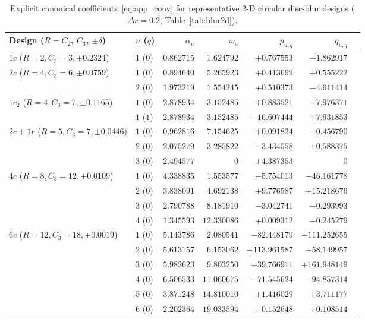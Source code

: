 \documentclass[11pt,a4paper]{article}
\theoremstyle{plain}
\theoremstyle{definition}
\begin{document}
\begin{table}[h]
\centering
\caption{Explicit canonical coefficients~\eqref{eq:app_conv} for representative 2-D circular disc-blur designs ($\Delta r = 0.2$, Table~\ref{tab:blur2d}).}\label{tab:app_blur}
\smallskip
{\scriptsize\setlength{\tabcolsep}{3.8pt}
\begin{tabular}{@{}llrrrrr@{}}
\toprule
Design ($R = C_2$, $C_3$, $\pm\delta$) & $u$ ($q$) & $\alpha_u$ & $\omega_u$ & $p_{u,q}$ & $q_{u,q}$ \\
\midrule
$1c$ ($R{=}2, C_3{=}3, \pm 0.2324$) & $1$ ($0$) & $0.862715$ & $1.624792$ & $+0.767553$ & $-1.862917$ \\
\midrule
$2c$ ($R{=}4, C_3{=}6, \pm 0.0759$) & $1$ ($0$) & $0.894640$ & $5.265923$ & $+0.413699$ & $+0.555222$ \\
 & $2$ ($0$) & $1.973219$ & $1.554245$ & $+0.510373$ & $-4.611414$ \\
\midrule
$1c_2$ ($R{=}4, C_3{=}7, \pm 0.1165$) & $1$ ($0$) & $2.878934$ & $3.152485$ & $+0.883521$ & $-7.976371$ \\
 & $1$ ($1$) & $2.878934$ & $3.152485$ & $-16.607444$ & $+7.931853$ \\
\midrule
$2c{+}1r$ ($R{=}5, C_3{=}7, \pm 0.0446$) & $1$ ($0$) & $0.962816$ & $7.154625$ & $+0.091824$ & $-0.456790$ \\
 & $2$ ($0$) & $2.075279$ & $3.285822$ & $-3.434558$ & $+0.588375$ \\
 & $3$ ($0$) & $2.494577$ & $0$ & $+4.387353$ & $0$ \\
\midrule
$4c$ ($R{=}8, C_3{=}12, \pm 0.0109$) & $1$ ($0$) & $4.338835$ & $1.553577$ & $-5.754013$ & $-46.161778$ \\
 & $2$ ($0$) & $3.838091$ & $4.692138$ & $+9.776587$ & $+15.218676$ \\
 & $3$ ($0$) & $2.790788$ & $8.181910$ & $-3.042741$ & $-0.293993$ \\
 & $4$ ($0$) & $1.345593$ & $12.330086$ & $+0.009312$ & $-0.245279$ \\
\midrule
$6c$ ($R{=}12, C_3{=}18, \pm 0.0019$) & $1$ ($0$) & $5.143786$ & $2.080541$ & $-82.448179$ & $-111.252655$ \\
 & $2$ ($0$) & $5.613157$ & $6.153062$ & $+113.961587$ & $-58.149957$ \\
 & $3$ ($0$) & $5.982623$ & $9.803250$ & $+39.766911$ & $+161.948149$ \\
 & $4$ ($0$) & $6.506533$ & $11.060675$ & $-71.545624$ & $-94.857314$ \\
 & $5$ ($0$) & $3.871248$ & $14.810010$ & $+1.416029$ & $+3.711177$ \\
 & $6$ ($0$) & $2.202364$ & $19.033594$ & $-0.152648$ & $+0.108514$ \\
\bottomrule
\end{tabular}}
\end{table}
\end{document}
